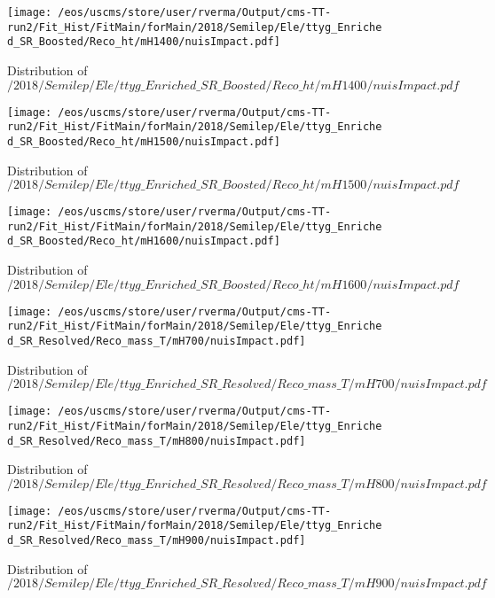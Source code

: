 \begin{figure}
\centering
\texttt{[image: /eos/uscms/store/user/rverma/Output/cms-TT-run2/Fit\_Hist/FitMain/forMain/2018/Semilep/Ele/ttyg\_Enriched\_SR\_Boosted/Reco\_ht/mH1400/nuisImpact.pdf]}
\caption{Distribution of $/2018/Semilep/Ele/ttyg\_Enriched\_SR\_Boosted/Reco\_ht/mH1400/nuisImpact.pdf$}
\end{figure}

\begin{figure}
\centering
\texttt{[image: /eos/uscms/store/user/rverma/Output/cms-TT-run2/Fit\_Hist/FitMain/forMain/2018/Semilep/Ele/ttyg\_Enriched\_SR\_Boosted/Reco\_ht/mH1500/nuisImpact.pdf]}
\caption{Distribution of $/2018/Semilep/Ele/ttyg\_Enriched\_SR\_Boosted/Reco\_ht/mH1500/nuisImpact.pdf$}
\end{figure}

\begin{figure}
\centering
\texttt{[image: /eos/uscms/store/user/rverma/Output/cms-TT-run2/Fit\_Hist/FitMain/forMain/2018/Semilep/Ele/ttyg\_Enriched\_SR\_Boosted/Reco\_ht/mH1600/nuisImpact.pdf]}
\caption{Distribution of $/2018/Semilep/Ele/ttyg\_Enriched\_SR\_Boosted/Reco\_ht/mH1600/nuisImpact.pdf$}
\end{figure}

\begin{figure}
\centering
\texttt{[image: /eos/uscms/store/user/rverma/Output/cms-TT-run2/Fit\_Hist/FitMain/forMain/2018/Semilep/Ele/ttyg\_Enriched\_SR\_Resolved/Reco\_mass\_T/mH700/nuisImpact.pdf]}
\caption{Distribution of $/2018/Semilep/Ele/ttyg\_Enriched\_SR\_Resolved/Reco\_mass\_T/mH700/nuisImpact.pdf$}
\end{figure}

\begin{figure}
\centering
\texttt{[image: /eos/uscms/store/user/rverma/Output/cms-TT-run2/Fit\_Hist/FitMain/forMain/2018/Semilep/Ele/ttyg\_Enriched\_SR\_Resolved/Reco\_mass\_T/mH800/nuisImpact.pdf]}
\caption{Distribution of $/2018/Semilep/Ele/ttyg\_Enriched\_SR\_Resolved/Reco\_mass\_T/mH800/nuisImpact.pdf$}
\end{figure}

\begin{figure}
\centering
\texttt{[image: /eos/uscms/store/user/rverma/Output/cms-TT-run2/Fit\_Hist/FitMain/forMain/2018/Semilep/Ele/ttyg\_Enriched\_SR\_Resolved/Reco\_mass\_T/mH900/nuisImpact.pdf]}
\caption{Distribution of $/2018/Semilep/Ele/ttyg\_Enriched\_SR\_Resolved/Reco\_mass\_T/mH900/nuisImpact.pdf$}
\end{figure}

